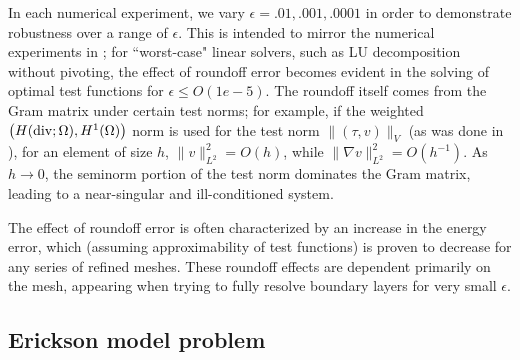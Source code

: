 \documentclass[11pt,onecolumn]{scrartcl}
\newcommand{\grad}{\nabla}
\begin{document}


In each numerical experiment, we vary $\epsilon = .01, .001, .0001$ in order to demonstrate robustness over a range of $\epsilon$.  This is intended to mirror the numerical experiments in \cite{DPGrobustness}; for ``worst-case" linear solvers, such as LU decomposition without pivoting, the effect of roundoff error becomes evident in the solving of optimal test functions for $\epsilon \leq O(1e-5)$.  The roundoff itself comes from the Gram matrix under certain test norms; for example, if the weighted $\left(H({\rm div};\Omega), H^1(\Omega)\right)$ norm is used for the test norm $\|\left(\tau,v\right)\|_V$ (as was done in \cite{DPG2}), for an element of size $h$, $\|v\|_{L^2}^2 = O(h)$, while $\|\grad v\|_{L^2}^2 = O(h^{-1})$. As $h\rightarrow 0$, the seminorm portion of the test norm dominates the Gram matrix, leading to a near-singular and ill-conditioned system. 

The effect of roundoff error is often characterized by an increase in the energy error, which (assuming approximability of test functions) is proven to decrease for any series of refined meshes. These roundoff effects are dependent primarily on the mesh, appearing when trying to fully resolve boundary layers for very small $\epsilon$. 


\subsection{Erickson model problem}
\end{document}
